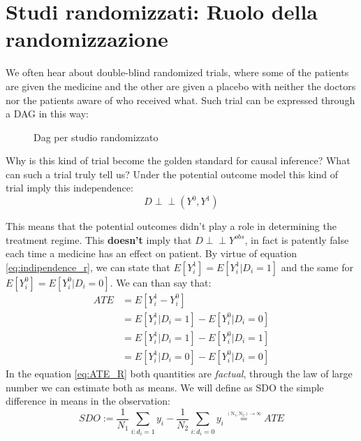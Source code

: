 \section{Studi randomizzati: Ruolo della randomizzazione}
We often hear about double-blind randomized trials, where some of the patients are given the medicine and the other are given a placebo with neither the doctors nor the patients aware of who received what. Such trial can be expressed through a DAG in this way: 
\begin{figure}[H]
\centering
\caption{Dag per studio randomizzato}
\label{fig:dag_random_EX}
\end{figure}
Why is this kind of trial become the golden standard for causal inference? What can such a trial truly tell us?
Under the potential outcome model this kind of trial imply this independence:
\begin{equation}
D \perp\!\!\!\perp (Y^{0},Y^{1})
\end{equation}
\label{eq:indipendence_r}

This means that the potential outcomes didn't play a role in determining the treatment regime. This \textbf{doesn't} imply that $D \perp\!\!\!\perp Y^{obs}$, in fact is patently false each time a medicine has an effect on patient. By virtue of equation \ref{eq:indipendence_r}, we can state that $E[Y^1_i] = E[Y^{1}_i | D_i = 1]  $ and the same for $E[Y^0_i] = E[Y^{0}_i | D_i = 0] $.
We can than say that:
\begin{align}
ATE &= E[Y^1_i-Y^0_i ] \\ 
 &= E[Y^{1}_i | D_i = 1]- E[Y^{0}_i | D_i = 0]\label{eq:ATE_R} \\
	& =E[Y^{1}_i | D_i = 1]- E[Y^{0}_i | D_i = 1] \label{eq:ATT_R} \\
 &= E[Y^{1}_i | D_i = 0]- E[Y^{0}_i | D_i = 0] \label{eq:ATU_R}
  \end{align}
In the equation \ref{eq:ATE_R} both quantities are \textit{factual}, through the law of large number we can estimate both as means. We will define as SDO the simple difference in means in the observation:
$$SDO := \frac{1}{N_1}\sum_{i:d_i=1}y_i - \frac{1}{N_2}\sum_{i:d_i=0}y_i \overset{\underset{\mathrm{(N_1, N_2) \rightarrow \infty}}{}}{=} ATE$$

